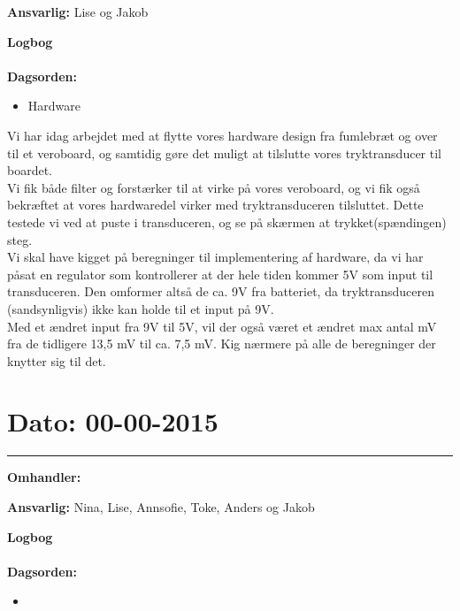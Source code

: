 \textbf{Ansvarlig:} Lise og Jakob

\textbf{Logbog}
\\
\\
\textbf{Dagsorden:}
\begin{itemize}
	\item Hardware
\end{itemize}

Vi har idag arbejdet med at flytte vores hardware design fra fumlebræt og over til et veroboard, og samtidig gøre det muligt at tilslutte vores tryktransducer til boardet.\\ 
Vi fik både filter og forstærker til at virke på vores veroboard, og vi fik også bekræftet at vores hardwaredel virker med tryktransduceren tilsluttet. Dette testede vi ved at puste i transduceren, og se på skærmen at trykket(spændingen) steg.	\\
Vi skal have kigget på beregninger til implementering af hardware, da vi har påsat en regulator som kontrollerer at der hele tiden kommer 5V som input til transduceren. Den omformer altså de ca. 9V fra batteriet, da tryktransduceren (sandsynligvis) ikke kan holde til et input på 9V.\\
Med et ændret input fra 9V til 5V, vil der også været et ændret max antal mV fra de tidligere 13,5 mV til ca. 7,5 mV. Kig nærmere på alle de beregninger der knytter sig til det.


	
	
\section{Dato: 00-00-2015 }
\hrule

\textbf{Omhandler:} 

\textbf{Ansvarlig:} Nina, Lise, Annsofie, Toke, Anders og Jakob

\textbf{Logbog}
\\
\\
\textbf{Dagsorden:}
\begin{itemize}
	\item 
\end{itemize}

